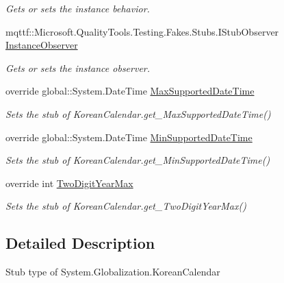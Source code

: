 \begin{DoxyCompactItemize}
\begin{DoxyCompactList}\small\item\em Gets or sets the instance behavior.\end{DoxyCompactList}\item 
mqttf\-::\-Microsoft.\-Quality\-Tools.\-Testing.\-Fakes.\-Stubs.\-I\-Stub\-Observer \hyperlink{class_system_1_1_globalization_1_1_fakes_1_1_stub_korean_calendar_a2053cf238281665b80d314c605f80e70}{Instance\-Observer}
\begin{DoxyCompactList}\small\item\em Gets or sets the instance observer.\end{DoxyCompactList}\item 
override global\-::\-System.\-Date\-Time \hyperlink{class_system_1_1_globalization_1_1_fakes_1_1_stub_korean_calendar_a32d1ce705eef65bc7ba4a0c2aeceae44}{Max\-Supported\-Date\-Time}
\begin{DoxyCompactList}\small\item\em Sets the stub of Korean\-Calendar.\-get\-\_\-\-Max\-Supported\-Date\-Time()\end{DoxyCompactList}\item 
override global\-::\-System.\-Date\-Time \hyperlink{class_system_1_1_globalization_1_1_fakes_1_1_stub_korean_calendar_a767c5c988b754562e897378a45a72fa7}{Min\-Supported\-Date\-Time}
\begin{DoxyCompactList}\small\item\em Sets the stub of Korean\-Calendar.\-get\-\_\-\-Min\-Supported\-Date\-Time()\end{DoxyCompactList}\item 
override int \hyperlink{class_system_1_1_globalization_1_1_fakes_1_1_stub_korean_calendar_a2f2decc15ee8fe3475ba6a75cf1a4ac5}{Two\-Digit\-Year\-Max}
\begin{DoxyCompactList}\small\item\em Sets the stub of Korean\-Calendar.\-get\-\_\-\-Two\-Digit\-Year\-Max()\end{DoxyCompactList}\end{DoxyCompactItemize}


\subsection{Detailed Description}
Stub type of System.\-Globalization.\-Korean\-Calendar



